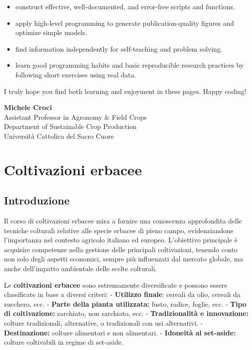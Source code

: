 \documentclass[
]{book}
\theoremstyle{definition}
\theoremstyle{definition}
\theoremstyle{definition}
\theoremstyle{definition}
\theoremstyle{remark}
\begin{document}
\begin{itemize}
\item
  construct effective, well-documented, and error-free scripts and functions.
\item
  apply high-level programming to generate publication-quality figures and optimize simple models.
\item
  find information independently for self-teaching and problem solving.
\item
  learn good programming habits and basic reproducible research practices by following short exercises using real data.
\end{itemize}

I truly hope you find both learning and enjoyment in these pages. Happy coding!

\textbf{Michele Croci}\\
Assistant Professor in Agronomy \& Field Crops\\
Department of Sustainable Crop Production\\
Università Cattolica del Sacro Cuore

\hypertarget{coltivazioni-erbacee}{%
\chapter{Coltivazioni erbacee}\label{coltivazioni-erbacee}}

\hypertarget{introduzione}{%
\section{Introduzione}\label{introduzione}}

Il corso di coltivazioni erbacee mira a fornire una conoscenza approfondita delle tecniche colturali relative alle specie erbacee di pieno campo, evidenziandone l'importanza nel contesto agricolo italiano ed europeo. L'obiettivo principale è acquisire competenze nella gestione delle principali coltivazioni, tenendo conto non solo degli aspetti economici, sempre più influenzati dal mercato globale, ma anche dell'impatto ambientale delle scelte colturali.

Le \textbf{coltivazioni erbacee} sono estremamente diversificate e possono essere classificate in base a diversi criteri: - \textbf{Utilizzo finale}: cereali da olio, cereali da zucchero, ecc. - \textbf{Parte della pianta utilizzata:} fusto, radice, foglie, ecc. - \textbf{Tipo di coltivazione:} sarchiato, non sarchiato, ecc. - \textbf{Tradizionalità e innovazione:} colture tradizionali, alternative, o tradizionali con usi alternativi. - \textbf{Destinazione:} colture alimentari e non alimentari. - \textbf{Idoneità al set-aside:} colture coltivabili in regime di set-aside.
\end{document}

